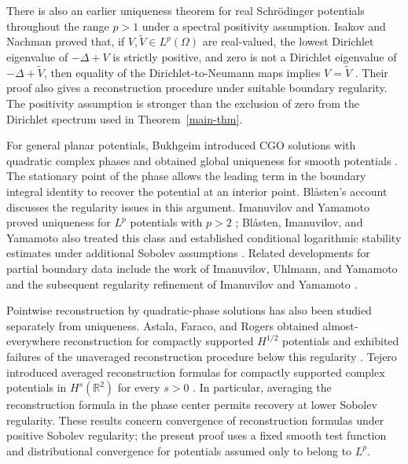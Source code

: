 \documentclass[a4paper,11pt]{article}
\theoremstyle{plain}
\theoremstyle{definition}
\theoremstyle{remark}
\begin{document}
There is also an earlier uniqueness theorem for real Schr\"odinger potentials throughout the range $p>1$ under a spectral positivity assumption. Isakov and Nachman proved that, if $V,\widetilde V\in L^p(\Omega)$ are real-valued, the lowest Dirichlet eigenvalue of $-\Delta+V$ is strictly positive, and zero is not a Dirichlet eigenvalue of $-\Delta+\widetilde V$, then equality of the Dirichlet-to-Neumann maps implies $V=\widetilde V$ \cite[Theorem~1.3]{IsakovNachman1995}. Their proof also gives a reconstruction procedure under suitable boundary regularity. The positivity assumption is stronger than the exclusion of zero from the Dirichlet spectrum used in Theorem~\ref{main-thm}.

For general planar potentials, Bukhgeim introduced CGO solutions with quadratic complex phases and obtained global uniqueness for smooth potentials \cite{Bukhgeim2008}. The stationary point of the phase allows the leading term in the boundary integral identity to recover the potential at an interior point. Bl\r{a}sten's account \cite{Blasten2011} discusses the regularity issues in this argument. Imanuvilov and Yamamoto proved uniqueness for $L^p$ potentials with $p>2$ \cite{ImanuvilovYamamotoLinear2012}; Bl\r{a}sten, Imanuvilov, and Yamamoto also treated this class and established conditional logarithmic stability estimates under additional Sobolev assumptions \cite{BlastenImanuvilovYamamoto2015}. Related developments for partial boundary data include the work of Imanuvilov, Uhlmann, and Yamamoto and the subsequent regularity refinement of Imanuvilov and Yamamoto \cite{ImanuvilovUhlmannYamamoto2010,ImanuvilovYamamoto2012}.

Pointwise reconstruction by quadratic-phase solutions has also been studied separately from uniqueness. Astala, Faraco, and Rogers obtained almost-everywhere reconstruction for compactly supported $H^{1/2}$ potentials and exhibited failures of the unaveraged reconstruction procedure below this regularity \cite{AstalaFaracoRogers2016}. Tejero introduced averaged reconstruction formulas for compactly supported complex potentials in $H^s(\mathbb R^2)$ for every $s>0$ \cite{Tejero2019}. In particular, averaging the reconstruction formula in the phase center permits recovery at lower Sobolev regularity. These results concern convergence of reconstruction formulas under positive Sobolev regularity; the present proof uses a fixed smooth test function and distributional convergence for potentials assumed only to belong to $L^p$.
\end{document}
